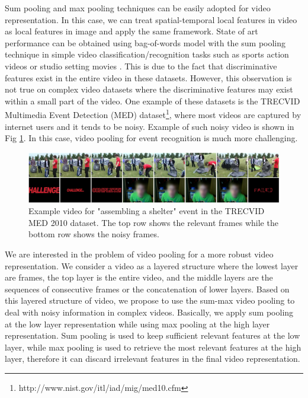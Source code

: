 Sum pooling and max pooling techniques can be easily adopted for video representation. In this case, we can treat spatial-temporal local features in video as local features in image and apply the same framework. State of art performance can be obtained using bag-of-words model with the sum pooling technique in simple video classification/recognition tasks such as sports action videos \cite{Rodriguez2008} or studio setting movies \cite{marszalek09}. This is due to the fact that discriminative features exist in the entire video in these datasets. However, this observation is not true on complex video datasets where the discriminative features may exist within a small part of the video. One example of these datasets is the TRECVID Multimedia Event Detection (MED) dataset\footnote{http://www.nist.gov/itl/iad/mig/med10.cfm}, where most videos are captured by internet users and it tends to be noisy. Example of such noisy video is shown in Fig \ref{f_teaser}. In this case, video pooling for event recognition is much more challenging.
\begin{figure}
	\centering
	\includegraphics[width=1\textwidth]{teaser_image.png}
	\caption{Example video for "assembling a shelter" event in the TRECVID MED 2010 dataset. The top row shows the relevant frames while the bottom row shows the noisy frames.}
	\label{f_teaser}
\end{figure}

We are interested in the problem of video pooling for a more robust video representation. We consider a video as a layered structure where the lowest layer are frames, the top layer is the entire video, and the middle layers are the sequences of consecutive frames or the concatenation of lower layers. Based on this layered structure of video, we propose to use the sum-max video pooling to deal with noisy information in complex videos. Basically, we apply sum pooling at the low layer representation while using max pooling at the high layer representation. Sum pooling is used to keep sufficient relevant features at the low layer, while max pooling is used to retrieve the most relevant features at the high layer, therefore it can discard irrelevant features in the final video representation. 

